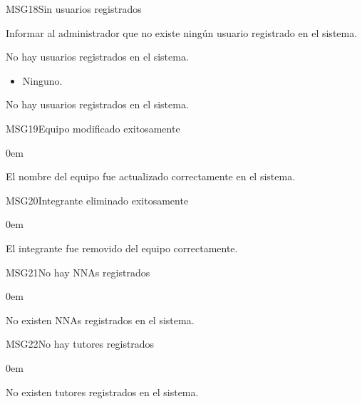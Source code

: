 \begin{cdtMessage}[msgWarningColor]{MSG18}{Sin usuarios registrados}
	\item[Propósito:] Informar al administrador que no existe 
	ningún usuario registrado en el sistema.
	\item[Redacción:] No hay usuarios registrados en el sistema.
	\item[Parámetros:] \hspace{1cm}
	\begin{itemize}
		\item Ninguno.
	\end{itemize}
	\item[Ejemplos:] No hay usuarios registrados en el sistema.
\end{cdtMessage}
\begin{cdtMessage}[msgInfoColor]{MSG19}{Equipo modificado exitosamente}
	\begin{description}\itemsep0em
		\item[Descripción:] El nombre del equipo fue actualizado correctamente en el sistema.
	\end{description}
\end{cdtMessage}

\begin{cdtMessage}[msgInfoColor]{MSG20}{Integrante eliminado exitosamente}
	\begin{description}\itemsep0em
		\item[Descripción:] El integrante fue removido del equipo correctamente.
	\end{description}
\end{cdtMessage}

\begin{cdtMessage}[msgWarningColor]{MSG21}{No hay NNAs registrados}
	\begin{description}\itemsep0em
		\item[Descripción:] No existen NNAs registrados en el sistema.
	\end{description}
\end{cdtMessage}

\begin{cdtMessage}[msgWarningColor]{MSG22}{No hay tutores registrados}
	\begin{description}\itemsep0em
		\item[Descripción:] No existen tutores registrados en el sistema.
	\end{description}
\end{cdtMessage}

